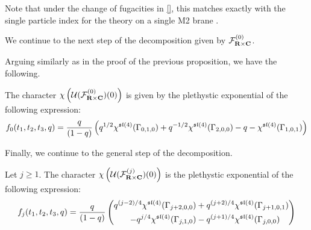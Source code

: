\documentclass[../main.tex]{subfiles}
\begin{document}
Note that under the change of fugacities in \ref{}, this matches exactly with the single particle index for the theory on a single M2 brane \cite[Eq. (2.32)]{Bhattacharya:2008zy}.

\parsec[]
We continue to the next step of the decomposition given by $\mathcal{F}^{(0)}_{\mathbf{R}\times \mathbf{C}}$. 

Arguing similarly as in the proof of the previous proposition, we have the following.
\begin{prop}
The character $\chi \left ( \mathcal{U} (\mathcal{F}^{(0)}_{\mathbf{R}\times \mathbf{C}})(0)\right )$ is given by the plethystic exponential of the following expression:
\begin{equation}
f_0(t_1, t_2, t_3, q) = \frac{q}{(1-q)}\left ( q^{1/2}\chi^{\mathfrak{sl}(4)}(\Gamma_{0,1,0})  + q^{-1/2}\chi^{\mathfrak{sl}(4)}(\Gamma_{2,0,0})  - q - \chi^{\mathfrak{sl}(4)}(\Gamma_{1,0,1}) \right)
\end{equation}
\end{prop}

\parsec[]
Finally, we continue to the general step of the decomposition.

\begin{prop}
Let $j\geq 1$. The character $\chi \left ( \mathcal{U} (\mathcal{F}^{(j)}_{\mathbf{R}\times \mathbf{C}} ) (0)\right )$ is the plethystic exponential of the following expression:
\begin{equation}
f_j(t_1, t_2, t_3, q) = \frac{q}{(1-q)}\left (\begin{aligned} q^{(j-2)/4}\chi^{\mathfrak{sl}(4)}(\Gamma_{j+2,0,0})  &+ q^{(j+2)/4}\chi^{\mathfrak{sl}(4)}(\Gamma_{j+1,0,1}) \\ - q^{j/4}\chi^{\mathfrak{sl}(4)}(\Gamma_{j,1,0}) & - q^{(j+1)/4}\chi^{\mathfrak{sl}(4)}(\Gamma_{j,0,0}) \end{aligned}\right)
\end{equation}
\end{prop}
\end{document}
